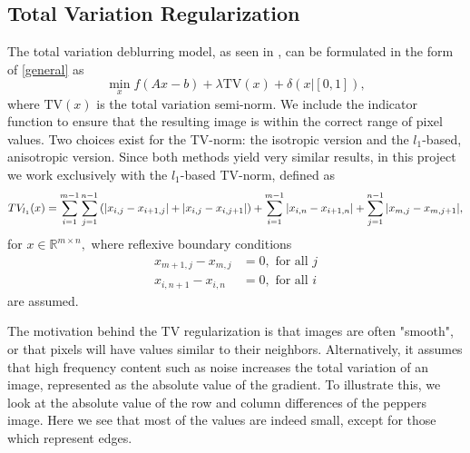 \documentclass[10pt,a4paper]{article}
\newcommand{\R}{\mathbb{R}}
\begin{document}
\subsection{Total Variation Regularization}
The total variation deblurring model, as seen in \cite{TV}, can be formulated in the form of \eqref{general} as 
\begin{equation} \label{tv_orig}
\min_{x} f(Ax-b) +  \lambda \mathrm{TV}(x)+ \delta(x | [0,1]),
\end{equation}
where $\mathrm{TV}(x)$ is the total variation semi-norm.  We include the indicator function to ensure that the resulting image is within the correct range of pixel values.  Two choices exist for the TV-norm: the isotropic version and the $l_1$-based, anisotropic version. Since both methods yield very similar results, in this project we work exclusively with the $l_1$-based TV-norm, defined as 
$$ TV_{l_1}(x) = \sum_{i=1}^{m-1} \sum_{j=1}^{n-1} \left( \abs{x_{i,j}  - x_{i+1,j} } + \abs{ x_{i,j} - x_{i,j+1}  } \right) + \sum_{i=1}^{m-1} \abs{ x_{i,n} - x_{i+1,n} } + \sum_{j=1}^{n-1} \abs{ x_{m,j} - x_{m,j+1 } },$$
 for $x \in \R^{m \times n},$ where reflexive boundary conditions
\begin{align*}
x_{m+1,j} - x_{m,j} &= 0, \textrm{ for all }j \\
 x_{i,n+1} - x_{i,n} &= 0, \textrm{ for all }i
\end{align*}
are assumed. 

The motivation behind the TV regularization is that images are often "smooth", or that pixels will have values similar to their neighbors. Alternatively, it assumes that high frequency content such as noise increases the total variation of an image, represented as the absolute value of the gradient. To illustrate this, we look at the absolute value of the row and column differences of the peppers image. Here we see that most of the values are indeed small, except for those which represent edges. 
\end{document}
